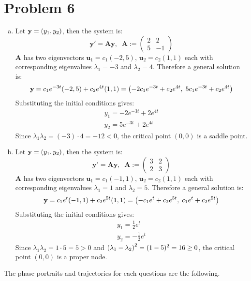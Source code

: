 \documentclass[10pt]{article}
\begin{document}
\section*{Problem 6}
\begin{enumerate}[(a), leftmargin=*]
    \item Let $\mathbf{y} = \qty(y_1, y_2)$, then the system is:
    $$\mathbf{y}' = \mathbf{A}\mathbf{y}, \;\; \mathbf{A} := \begin{pmatrix}
        2 & 2 \\ 5 & -1
    \end{pmatrix}$$
    $\mathbf{A}$ has two eigenvectors $\mathbf{u}_1 = c_1(-2, 5)$, $\mathbf{u}_2 = c_2(1, 1)$ each with corresponding eigenvalues $\lambda_1 = -3$ and $\lambda_2 = 4$.
    Therefore a general solution is:
    $$\mathbf{y} = c_1e^{-3t}(-2, 5) + c_2e^{4t}(1, 1) = \qty(-2c_1e^{-3t} + c_2e^{4t}, \; 5c_1e^{-3t} + c_2e^{4t})$$
    Substituting the initial conditions gives:
    \begin{gather*}
        y_1 = -2e^{-3t} + 2e^{4t} \\
        y_2 = 5e^{-3t} + 2e^{4t}
    \end{gather*}
    Since $\lambda_1\lambda_2 = (-3)\cdot 4 = -12 < 0$, the critical point $(0,0)$ is a saddle point. 
    \item Let $\mathbf{y} = \qty(y_1, y_2)$, then the system is:
    $$\mathbf{y}' = \mathbf{A}\mathbf{y}, \;\; \mathbf{A} := \begin{pmatrix}
        3 & 2 \\ 2 & 3
    \end{pmatrix}$$
    $\mathbf{A}$ has two eigenvectors $\mathbf{u}_1 = c_1(-1, 1)$, $\mathbf{u}_2 = c_2(1, 1)$ each with corresponding eigenvalues $\lambda_1 = 1$ and $\lambda_2 = 5$.
    Therefore a general solution is:
    $$\mathbf{y} = c_1e^{t}(-1, 1) + c_2e^{5t}(1, 1) = \qty(-c_1e^{t} + c_2e^{5t}, \; c_1e^{t} + c_2e^{5t})$$
    Substituting the initial conditions gives:
    \begin{gather*}
        y_1 = \frac{1}{2}e^t \\
        y_2 = -\frac{1}{2}e^t
    \end{gather*}
    Since $\lambda_1\lambda_2 = 1 \cdot 5 = 5 > 0$ and $\qty(\lambda_1 - \lambda_2)^2 = (1 - 5)^2 = 16 \geq 0$, the critical point $(0,0)$ is a proper node.
\end{enumerate}
The phase portraits and trajectories for each questions are the following.
\end{document}
